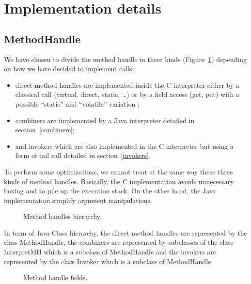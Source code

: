 \documentclass{sig-alternate}
\begin{document}
\section{Implementation details}
\label{implD}

    \subsection{MethodHandle}
      We have chosen to divide the method handle in three kinds (Figure~\ref{mhHier})
      depending on how we have decided to implement calls:
      \begin{itemize}
        \item direct method handles are implemented inside the C interpreter
              either by a classical call (virtual, direct, static, \dots)
              or by a field access (get, put) with a possible ``static'' and ``volatile'' variation ;
        \item combiners are implemented by a Java interpreter detailed in section~\ref{combiners};
        \item and invokers which are also implemented in the C interpreter but using a form of tail call
              detailed in section~\ref{invokers}.
      \end{itemize}

      To perform some optimizations, we cannot treat at the same way these three kinds of method handles.
      Basically, the C implementation avoids unnecessary boxing and to pile up the execution stack.
      On the other hand, the Java implementation simplify argument manipulations.

      \begin{figure}[!ht]
        \centering \resizebox{\linewidth}{!}{}
        \caption{Method handles hierarchy.}
        \label{mhHier}
      \end{figure}

      In term of Java Class hierarchy, the direct method handles are represented by the class MethodHandle,
      the combiners are represented by subclasses of the class InterpretMH which is a subclass of MethodHandle
      and the invokers are represented by the class Invoker which is a subclass of MethodHandle.

      \begin{figure}[!ht]
        \centering \vspace{-1.5em}
        \caption{Method handle fields.}
        \label{mhFields}
      \end{figure}
\end{document}
